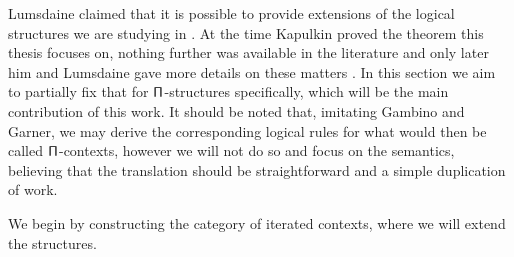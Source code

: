 Lumsdaine claimed that it is possible to provide extensions of the logical
structures we are studying in \cite[26]{Lum10}. At the
time Kapulkin proved the theorem this thesis focuses on,
nothing further was available in the literature and only later him and
Lumsdaine gave more details on these matters \cite{KL18}. In this section we aim
to partially fix that for $\operatorname{\mathsf{\Pi}}$-structures specifically, which will be the main
contribution of this work. It should be noted that, imitating Gambino and
Garner, we may derive the
corresponding logical rules for what would then be called $\operatorname{\mathsf{\Pi}}$-contexts,
however we will not do so and focus on the semantics, believing that the
translation should be straightforward and a simple duplication of work.

We begin by constructing the category of iterated contexts, where we
will extend the structures.

